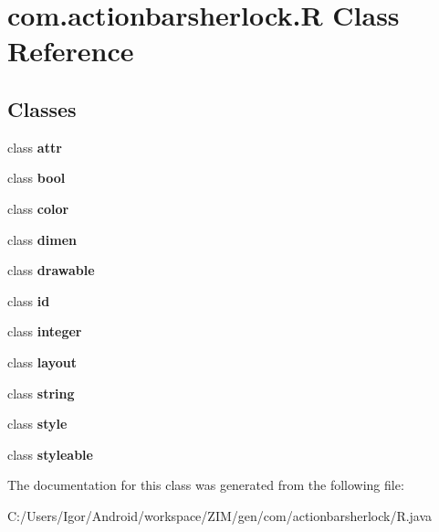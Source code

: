 \hypertarget{classcom_1_1actionbarsherlock_1_1_r}{\section{com.\-actionbarsherlock.\-R Class Reference}
\label{classcom_1_1actionbarsherlock_1_1_r}
}
\subsection*{Classes}
\begin{DoxyCompactItemize}
\item 
class {\bfseries attr}
\item 
class {\bfseries bool}
\item 
class {\bfseries color}
\item 
class {\bfseries dimen}
\item 
class {\bfseries drawable}
\item 
class {\bfseries id}
\item 
class {\bfseries integer}
\item 
class {\bfseries layout}
\item 
class {\bfseries string}
\item 
class {\bfseries style}
\item 
class {\bfseries styleable}
\end{DoxyCompactItemize}


The documentation for this class was generated from the following file\-:\begin{DoxyCompactItemize}
\item 
C\-:/\-Users/\-Igor/\-Android/workspace/\-Z\-I\-M/gen/com/actionbarsherlock/R.\-java\end{DoxyCompactItemize}
